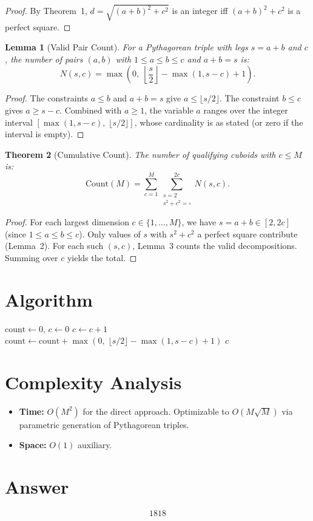 \documentclass[12pt]{article}
\newtheorem{theorem}{Theorem}
\newtheorem{lemma}[theorem]{Lemma}
\begin{document}
\begin{proof}
By Theorem~1, $d = \sqrt{(a+b)^2 + c^2}$ is an integer iff $(a+b)^2 + c^2$ is a perfect square.
\end{proof}

\begin{lemma}[Valid Pair Count]
For a Pythagorean triple with legs $s = a+b$ and $c$, the number of pairs $(a,b)$ with $1 \leq a \leq b \leq c$ and $a + b = s$ is:
\[
N(s, c) = \max\!\left(0,\; \left\lfloor \frac{s}{2} \right\rfloor - \max(1, s-c) + 1\right).
\]
\end{lemma}

\begin{proof}
The constraints $a \leq b$ and $a + b = s$ give $a \leq \lfloor s/2 \rfloor$. The constraint $b \leq c$ gives $a \geq s - c$. Combined with $a \geq 1$, the variable $a$ ranges over the integer interval $[\max(1, s-c),\; \lfloor s/2 \rfloor]$, whose cardinality is as stated (or zero if the interval is empty).
\end{proof}

\begin{theorem}[Cumulative Count]
The number of qualifying cuboids with $c \leq M$ is:
\[
\mathrm{Count}(M) = \sum_{c=1}^{M} \sum_{\substack{s=2 \\ s^2 + c^2 = \square}}^{2c} N(s, c).
\]
\end{theorem}

\begin{proof}
For each largest dimension $c \in \{1, \ldots, M\}$, we have $s = a + b \in [2, 2c]$ (since $1 \le a \le b \le c$). Only values of $s$ with $s^2 + c^2$ a perfect square contribute (Lemma~2). For each such $(s, c)$, Lemma~3 counts the valid decompositions. Summing over $c$ yields the total.
\end{proof}

\section{Algorithm}

\begin{algorithm}[H]
\caption{Cuboid Route}
\begin{algorithmic}[1]
\STATE $\text{count} \gets 0$, $c \gets 0$
    \STATE $c \gets c + 1$
            \STATE $\text{count} \gets \text{count} + \max(0,\; \lfloor s/2 \rfloor - \max(1, s-c) + 1)$
        \ENDIF
    \ENDFOR
\ENDWHILE
\RETURN $c$
\end{algorithmic}
\end{algorithm}

\section{Complexity Analysis}

\begin{itemize}
    \item \textbf{Time:} $O(M^2)$ for the direct approach. Optimizable to $O(M\sqrt{M})$ via parametric generation of Pythagorean triples.
    \item \textbf{Space:} $O(1)$ auxiliary.
\end{itemize}

\section{Answer}

\[
\boxed{1818}
\]
\end{document}
